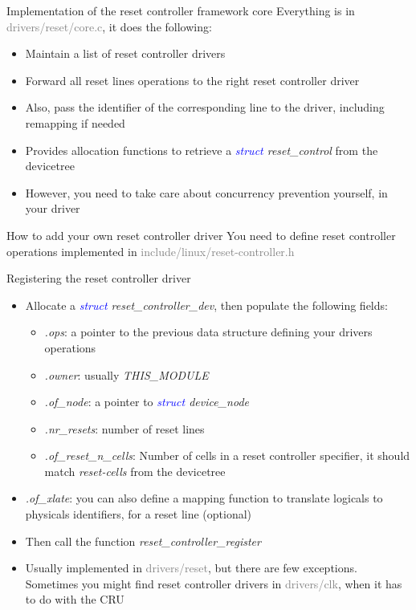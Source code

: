 \documentclass{beamer}
\begin{document}
\begin{frame}{Implementation of the reset controller framework core}
	Everything is in \textcolor{gray}{drivers/reset/core.c}, it does the following:
	\begin{itemize}
		\item Maintain a list of reset controller drivers
		\item Forward all reset lines operations to the right reset controller driver
		\item Also, pass the identifier of the corresponding line to the driver, including remapping if needed
		\item Provides allocation functions to retrieve a \textit{\textcolor{blue}{struct} reset\_control} from the devicetree
		\item However, you need to take care about concurrency prevention yourself, in your driver
	\end{itemize}
\end{frame}

\begin{frame}{How to add your own reset controller driver}
	You need to define reset controller operations implemented in \textcolor{gray}{include/linux/reset-controller.h}
	
\end{frame}


\begin{frame}{Registering the reset controller driver}
	\begin{itemize}
		\item Allocate a \textit{\textcolor{blue}{struct} reset\_controller\_dev}, then populate the following fields:
		\begin{itemize}
			\item \textit{.ops}: a pointer to the previous data structure defining your drivers operations
			\item \textit{.owner}: usually \textit{THIS\_MODULE}
			\item \textit{.of\_node}: a pointer to \textit{\textcolor{blue}{struct} device\_node}
			\item \textit{.nr\_resets}: number of reset lines
			\item \textit{.of\_reset\_n\_cells}: Number of cells in a reset controller specifier, it should match \textit{reset-cells} from the devicetree
		\end{itemize}
		\item \textit{.of\_xlate}: you can also define a mapping function to translate logicals to physicals identifiers, for a reset line (optional)
		\item Then call the function \textit{reset\_controller\_register}
		\item Usually implemented in \textcolor{gray}{drivers/reset}, but there are few exceptions. Sometimes you might find reset controller drivers in \textcolor{gray}{drivers/clk}, when it has to do with the CRU
	\end{itemize}
\end{frame}
\end{document}
